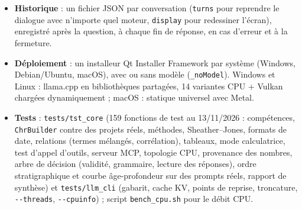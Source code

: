 \documentclass[11pt,a4paper]{article}
\newcommand{\code}[1]{\texttt{\small #1}}
\begin{document}
\begin{itemize}[leftmargin=*]
\item \textbf{Historique} : un fichier JSON par conversation (\code{turns} pour reprendre le dialogue avec n'importe quel
  moteur, \code{display} pour redessiner l'écran), enregistré après la question, à chaque fin de réponse, en cas
  d'erreur et à la fermeture.
\item \textbf{Déploiement} : un installeur Qt Installer Framework par système (Windows, Debian/Ubuntu, macOS), avec ou
  sans modèle (\code{\_noModel}). Windows et Linux : llama.cpp en bibliothèques partagées, 14 variantes CPU + Vulkan
  chargées dynamiquement ; macOS : statique universel avec Metal.
\item \textbf{Tests} : \code{tests/tst\_core} (159 fonctions de test au 13/11/2026 : compétences, \code{ChrBuilder}
  contre des projets réels, méthodes, Sheather--Jones, formats de date, relations (termes mélangés, corrélation), tableaux,
  mode calculatrice, test d'appel d'outils, serveur MCP, topologie CPU, provenance des nombres, arbre de décision
  (validité, grammaire, lecture des réponses), ordre stratigraphique et courbe âge-profondeur sur des prompts réels, rapport de synthèse) et \code{tests/llm\_cli} (gabarit, cache KV,
  points de reprise, troncature, \code{-{}-threads}, \code{-{}-cpuinfo}) ; script \code{bench\_cpu.sh} pour le débit CPU.
\end{itemize}

\end{document}
